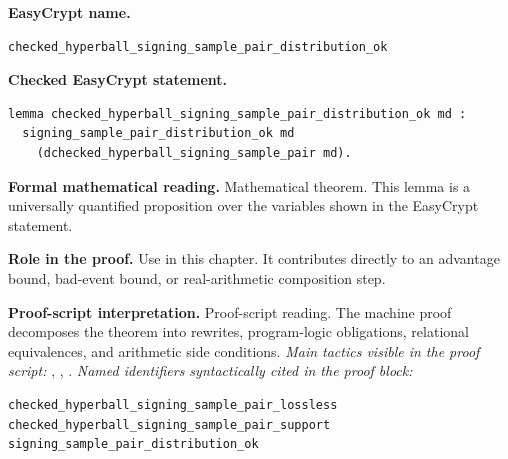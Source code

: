 \begin{formaltheorem}
\noindent\textbf{EasyCrypt name.}
\begin{lstlisting}[language=EasyCrypt,basicstyle=\ttfamily\scriptsize]
checked_hyperball_signing_sample_pair_distribution_ok
\end{lstlisting}
\noindent\textbf{Checked EasyCrypt statement.}
\begin{lstlisting}[language=EasyCrypt,basicstyle=\ttfamily\scriptsize]
lemma checked_hyperball_signing_sample_pair_distribution_ok md :
  signing_sample_pair_distribution_ok md
    (dchecked_hyperball_signing_sample_pair md).
\end{lstlisting}
\noindent\textbf{Formal mathematical reading.}
Mathematical theorem. This lemma is a universally quantified proposition over the variables shown in the EasyCrypt statement.

\noindent\textbf{Role in the proof.}
Use in this chapter. It contributes directly to an advantage bound, bad-event bound, or real-arithmetic composition step.

\noindent\textbf{Proof-script interpretation.}
Proof-script reading. The machine proof decomposes the theorem into rewrites, program-logic obligations, relational equivalences, and arithmetic side conditions.
\emph{Main tactics visible in the proof script:} , , .
\emph{Named identifiers syntactically cited in the proof block:}
\begin{lstlisting}[language=EasyCrypt,basicstyle=\ttfamily\scriptsize]
checked_hyperball_signing_sample_pair_lossless
checked_hyperball_signing_sample_pair_support
signing_sample_pair_distribution_ok
\end{lstlisting}

\end{formaltheorem}

